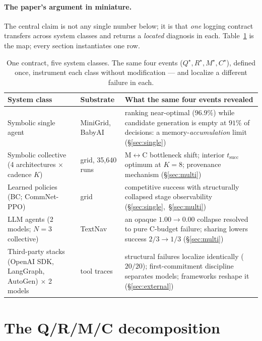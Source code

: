 \documentclass{article}
\begin{document}
\paragraph{The paper's argument in miniature.} The central claim is
not any single number below; it is that \emph{one} logging contract
transfers across system classes and returns a \emph{located} diagnosis
in each. Table~\ref{tab:portability} is the map; every section
instantiates one row.

\begin{table}[t]
\caption{One contract, five system classes. The same four events
($Q^\star,R^\star,M^\star,C^\star$), defined once, instrument each
class without modification --- and localize a different failure in
each.}
\label{tab:portability}
\centering
\small
\begin{tabular}{p{3.4cm} p{2.6cm} p{6.6cm}}
\toprule
System class & Substrate & What the same four events revealed \\
\midrule
Symbolic single agent & MiniGrid, BabyAI & ranking near-optimal ($96.9\%$) while candidate generation is empty at $91\%$ of decisions: a memory-\emph{accumulation} limit (\S\ref{sec:single}) \\
Symbolic collective (4 architectures $\times$ cadence $K$) & grid, 35{,}640 runs & M$\leftrightarrow$C bottleneck shift; interior $t_{\mathrm{succ}}$ optimum at $K{=}8$; provenance mechanism (\S\ref{sec:multi}) \\
Learned policies (BC; CommNet-PPO) & grid & competitive success with structurally collapsed stage observability (\S\ref{sec:single},~\S\ref{sec:multi}) \\
LLM agents (2 models; $N{=}3$ collective) & TextNav & an opaque $1.00\!\to\!0.00$ collapse resolved to pure C-budget failure; sharing lowers success $2/3\!\to\!1/3$ (\S\ref{sec:multi}) \\
Third-party stacks (OpenAI SDK, LangGraph, AutoGen) $\times$ 2 models & tool traces & structural failures localize identically ($20/20$); first-commitment discipline separates models; frameworks reshape it (\S\ref{sec:external}) \\
\bottomrule
\end{tabular}
\end{table}

\section{The Q/R/M/C decomposition}
\label{sec:framework}
\end{document}
